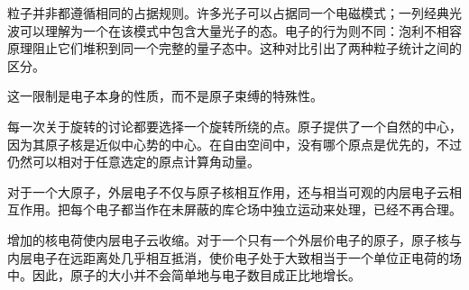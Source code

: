 粒子并非都遵循相同的占据规则。许多光子可以占据同一个电磁模式；一列经典光波可以理解为一个在该模式中包含大量光子的态。电子的行为则不同：泡利不相容原理阻止它们堆积到同一个完整的量子态中。这种对比引出了两种粒子统计之间的区分。

\begin{classroomqa}
\end{classroomqa}

这一限制是电子本身的性质，而不是原子束缚的特殊性。

\begin{classroomqa}
\end{classroomqa}

每一次关于旋转的讨论都要选择一个旋转所绕的点。原子提供了一个自然的中心，因为其原子核是近似中心势的中心。在自由空间中，没有哪个原点是优先的，不过仍然可以相对于任意选定的原点计算角动量。

\begin{classroomqa}
\end{classroomqa}

对于一个大原子，外层电子不仅与原子核相互作用，还与相当可观的内层电子云相互作用。把每个电子都当作在未屏蔽的库仑场中独立运动来处理，已经不再合理。

\begin{classroomqa}
\end{classroomqa}

增加的核电荷使内层电子云收缩。对于一个只有一个外层价电子的原子，原子核与内层电子在远距离处几乎相互抵消，使价电子处于大致相当于一个单位正电荷的场中。因此，原子的大小并不会简单地与电子数目成正比地增长。

